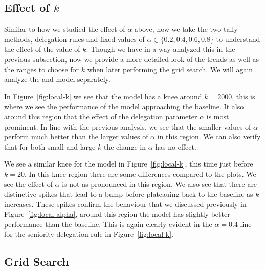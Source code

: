 \subsection{Effect of $k$}
Similar to how we studied the effect of $\alpha$ above, now we take the two tally methods, delegation rules and fixed values of $\alpha \in \{0.2,0.4,0.6,0.8\}$ to understand the effect of the value of $k$. Though we have in a way analyzed this in the previous subsection, now we provide a more detailed look of the trends as well as the ranges to choose for $k$ when later performing the grid search. We will again analyze the \globalv and \localv model separately.
\smallskip

In Figure~\ref{fig:local-k} we see that the \globalv model has a knee around $k=2000$, this is where we see the performance of the model approaching the baseline. It also around this region that the effect of the delegation parameter $\alpha$ is most prominent. In line with the previous analysis, we see that the smaller values of $\alpha$ perform much better than the larger values of $\alpha$ in this region. We can also verify that for both small and large $k$ the change in $\alpha$ has no effect. \
\smallskip

We see a similar knee for the \localv model in Figure~\ref{fig:local-k}, this time just before $k=20$. In this knee region there are some differences compared to the \globalv plots. We see the effect of $\alpha$ is not as pronounced in this region. We also see that there are distinctive spikes that lead to a bump before plateauing back to the baseline as $k$ increases. These spikes confirm the behaviour that we discussed previously in Figure~\ref{fig:local-alpha}, around this region the \localv model has slightly better performance than the baseline. This is again clearly evident in the $\alpha=0.4$ line for the seniority delegation rule in Figure~\ref{fig:local-k}.

\subsection{Grid Search}

